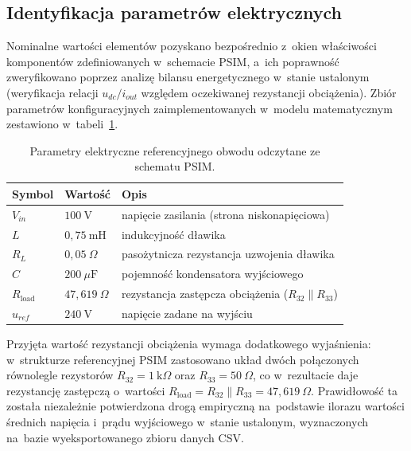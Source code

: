 \subsection{Identyfikacja parametrów elektrycznych}
\label{subsec:parametry}

Nominalne wartości elementów pozyskano bezpośrednio z~okien właściwości komponentów zdefiniowanych w~schemacie PSIM, a~ich poprawność zweryfikowano poprzez analizę bilansu energetycznego w~stanie ustalonym (weryfikacja relacji $u_{dc}/i_{out}$ względem oczekiwanej rezystancji obciążenia). Zbiór parametrów konfiguracyjnych zaimplementowanych w~modelu matematycznym zestawiono w~tabeli~\ref{tab:parametry-obwodu}.

\begin{table}[ht]
    \centering
    \caption{Parametry elektryczne referencyjnego obwodu odczytane ze schematu PSIM.}
    \label{tab:parametry-obwodu}
    \begin{tabular}{lll}
        \toprule
        \textbf{Symbol} & \textbf{Wartość} & \textbf{Opis} \\
        \midrule
        $V_{in}$  & $100~\mathrm{V}$       & napięcie zasilania (strona niskonapięciowa) \\
        $L$       & $0{,}75~\mathrm{mH}$   & indukcyjność dławika \\
        $R_L$     & $0{,}05~\Omega$        & pasożytnicza rezystancja uzwojenia dławika \\
        $C$       & $200~\mu\mathrm{F}$    & pojemność kondensatora wyjściowego \\
        $R_{\mathrm{load}}$ & $47{,}619~\Omega$      & rezystancja zastępcza obciążenia ($R_{32}\parallel R_{33}$) \\
        $u_{ref}$ & $240~\mathrm{V}$       & napięcie zadane na wyjściu \\
        \bottomrule
    \end{tabular}
\end{table}

Przyjęta wartość rezystancji obciążenia wymaga dodatkowego wyjaśnienia: w~strukturze referencyjnej PSIM zastosowano układ dwóch połączonych równolegle rezystorów $R_{32}=1~\mathrm{k}\Omega$ oraz $R_{33}=50~\Omega$, co w~rezultacie daje rezystancję zastępczą o~wartości $R_{\mathrm{load}}=R_{32}\parallel R_{33}=47{,}619~\Omega$. Prawidłowość ta została niezależnie potwierdzona drogą empiryczną na~podstawie ilorazu wartości średnich napięcia i~prądu wyjściowego w~stanie ustalonym, wyznaczonych na~bazie wyeksportowanego zbioru danych CSV.

